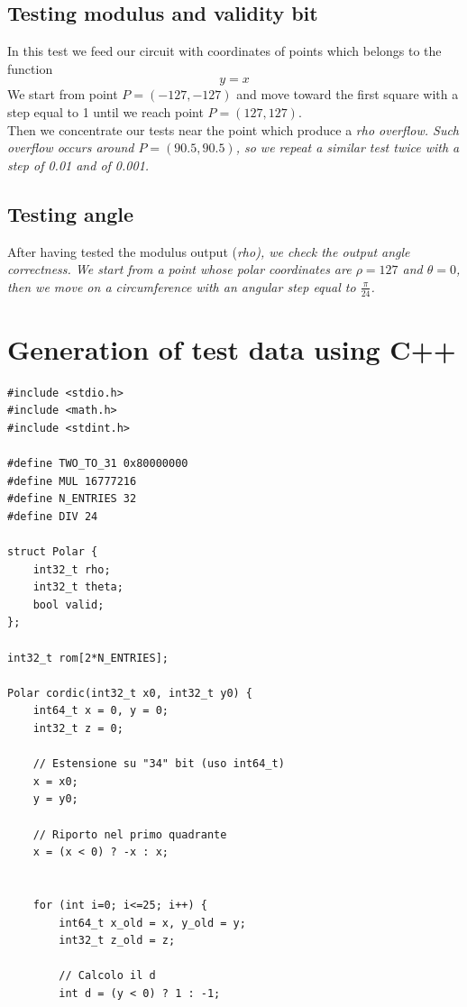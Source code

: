 \documentclass[12pt,a4paper]{report}
\begin{document}
\begin{itemize}
\subsection{Testing modulus and validity bit}
In this test we feed our circuit with coordinates of points which belongs to the function
	\begin{equation}
		y = x
  	\end{equation}
We start from point $P = \left(-127, -127\right)$ and move toward the first square with a step equal to 1 until we reach point $P=(127,127)$.\\
Then we concentrate our tests near the point which produce a \em{rho} overflow. Such overflow occurs around $P=(90.5,90.5)$, so we repeat a similar test twice with a step of 0.01 and of 0.001.

\subsection{Testing angle}
After having tested the modulus output (\em{rho}), we check the output angle correctness. We start from a point whose polar coordinates are $\rho=127$ and $\theta=0$, then we move on a circumference with an angular step equal to $\frac{\pi}{24}$.

\section{Generation of test data using C++}

\begin{lstlisting}[caption={Test-data generation}]
#include <stdio.h>
#include <math.h>
#include <stdint.h>

#define TWO_TO_31 0x80000000
#define MUL 16777216
#define N_ENTRIES 32
#define DIV 24

struct Polar {
    int32_t rho;
    int32_t theta;
    bool valid;
};

int32_t rom[2*N_ENTRIES];

Polar cordic(int32_t x0, int32_t y0) {
    int64_t x = 0, y = 0;
    int32_t z = 0;
    
    // Estensione su "34" bit (uso int64_t)
    x = x0;
    y = y0;
    
    // Riporto nel primo quadrante
    x = (x < 0) ? -x : x;
    
    
    for (int i=0; i<=25; i++) {
        int64_t x_old = x, y_old = y;
        int32_t z_old = z;
        
        // Calcolo il d
        int d = (y < 0) ? 1 : -1;
        

\end{lstlisting}
\end{itemize}
\end{document}
